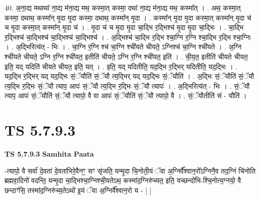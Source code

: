 \documentclass[17pt]{extarticle}
\begin{document}
40. अ॒ना॒द्य मथाथा॑ ना॒द्य म॑ना॒द्य मथ॒ कस्मा॒त् कस्मा॒ दथा॑ ना॒द्य म॑ना॒द्य मथ॒ कस्मा᳚त् । . अथ॒ कस्मा॒त् कस्मा॒ दथाथ॒ कस्मा᳚न् मृ॒दा मृ॒दा कस्मा॒ दथाथ॒ कस्मा᳚न् मृ॒दा । . कस्मा᳚न् मृ॒दा मृ॒दा कस्मा॒त् कस्मा᳚न् मृ॒दा च॑ च मृ॒दा कस्मा॒त् कस्मा᳚न् मृ॒दा च॑ । . मृ॒दा च॑ च मृ॒दा मृ॒दा चा॒द्भि र॒द्भिश्च॑ मृ॒दा मृ॒दा चा॒द्भिः । . चा॒द्भि र॒द्भिश्च॑ चा॒द्भिश्च॑ चा॒द्भिश्च॑ चा॒द्भिश्च॑ । . अ॒द्भिश्च॑ चा॒द्भि र॒द्भि श्चा॒ग्नि र॒ग्नि श्चा॒द्भि र॒द्भि श्चा॒ग्निः । . अ॒द्भिरित्य॑त् - भिः । . चा॒ग्नि र॒ग्नि श्च॑ चा॒ग्नि श्ची॑यते चीयते॒ ऽग्निश्च॑ चा॒ग्नि श्ची॑यते । . अ॒ग्नि श्ची॑यते चीयते॒ ऽग्नि र॒ग्नि श्ची॑यत॒ इतीति॑ चीयते॒ ऽग्नि र॒ग्नि श्ची॑यत॒ इति॑ । . ची॒य॒त॒ इतीति॑ चीयते चीयत॒ इति॒ यद् यदिति॑ चीयते चीयत॒ इति॒ यत् । . इति॒ यद् यदितीति॒ यद॒द्भि र॒द्भिर् यदितीति॒ यद॒द्भिः । . यद॒द्भि र॒द्भिर् यद् यद॒द्भिः सं॒ॅयौति॑ सं॒ॅयौ त्य॒द्भिर् यद् यद॒द्भिः सं॒ॅयौति॑ । . अ॒द्भिः सं॒ॅयौति॑ सं॒ॅयौ त्य॒द्भि र॒द्भिः सं॒ॅयौ त्याप॒ आपः॑ सं॒ॅयौ त्य॒द्भि र॒द्भिः सं॒ॅयौ त्यापः॑ । . अ॒द्भिरित्य॑त् - भिः । . सं॒ॅयौ त्याप॒ आपः॑ सं॒ॅयौति॑ सं॒ॅयौ त्यापो॒ वै वा आपः॑ सं॒ॅयौति॑ सं॒ॅयौ त्यापो॒ वै । . सं॒ॅयौतीति॑ सं - यौति॑ । \newline
\pagebreak
{}

\section{ TS 5.7.9.3 }

\textbf{TS 5.7.9.3 } \newline
\textbf{Samhita Paata} \newline

-त्यापो॒ वै सर्वा॑ दे॒वता॑ दे॒वता॑भिरे॒वैनꣳ॒॒ सꣳ सृ॑जति॒ यन्मृ॒दा चि॒नोती॒यं ॅवा अ॒ग्निर्वै᳚श्वान॒रो᳚ऽग्निनै॒व तद॒ग्निं चि॑नोति ब्रह्मवा॒दिनो॑ वदन्ति॒ यन्मृ॒दा चा॒द्भिश्चा॒ग्निश्ची॒यतेऽथ॒ कस्मा॑द॒ग्निरु॑च्यत॒ इति॒ यच्छन्दो॑भि-श्चि॒नोत्य॒ग्नयो॒ वै छन्दाꣳ॑सि॒ तस्मा॑द॒ग्निरु॑च्य॒तेऽथो॑ इ॒यं ॅवा अ॒ग्निर्वै᳚श्वान॒रो य - [  ] \newline
\end{document}
